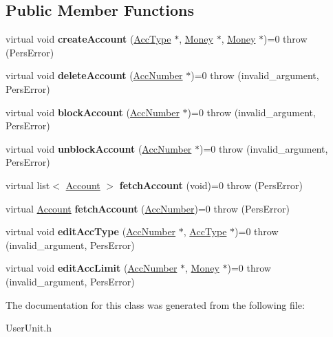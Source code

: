 \subsection*{Public Member Functions}
\begin{DoxyCompactItemize}
\item 
\hypertarget{classUserAccAdm_a23b313ce179890606746ab3a279bd833}{virtual void {\bfseries create\-Account} (\hyperlink{classUsrType}{Acc\-Type} $\ast$, \hyperlink{classMoney}{Money} $\ast$, \hyperlink{classMoney}{Money} $\ast$)=0  throw (\-Pers\-Error)}\label{dd/d35/classUserAccAdm_a23b313ce179890606746ab3a279bd833}

\item 
\hypertarget{classUserAccAdm_a8257788e5e7d125b7482e490a6d71550}{virtual void {\bfseries delete\-Account} (\hyperlink{classAccNumber}{Acc\-Number} $\ast$)=0  throw (invalid\-\_\-argument, Pers\-Error)}\label{dd/d35/classUserAccAdm_a8257788e5e7d125b7482e490a6d71550}

\item 
\hypertarget{classUserAccAdm_ad9cdd01395ad7dd1b2c0887fe12b71b8}{virtual void {\bfseries block\-Account} (\hyperlink{classAccNumber}{Acc\-Number} $\ast$)=0  throw (invalid\-\_\-argument, Pers\-Error)}\label{dd/d35/classUserAccAdm_ad9cdd01395ad7dd1b2c0887fe12b71b8}

\item 
\hypertarget{classUserAccAdm_ae179b3e21f336b325452eb3c0981b0d9}{virtual void {\bfseries unblock\-Account} (\hyperlink{classAccNumber}{Acc\-Number} $\ast$)=0  throw (invalid\-\_\-argument, Pers\-Error)}\label{dd/d35/classUserAccAdm_ae179b3e21f336b325452eb3c0981b0d9}

\item 
\hypertarget{classUserAccAdm_aa84b9df92ad9e11b1d9c71e9350efdc7}{virtual list$<$ \hyperlink{classAccount}{Account} $>$ {\bfseries fetch\-Account} (void)=0  throw (\-Pers\-Error)}\label{dd/d35/classUserAccAdm_aa84b9df92ad9e11b1d9c71e9350efdc7}

\item 
\hypertarget{classUserAccAdm_a5957dcbf58d30b171a6ca0967dacf2d9}{virtual \hyperlink{classAccount}{Account} {\bfseries fetch\-Account} (\hyperlink{classAccNumber}{Acc\-Number})=0  throw (\-Pers\-Error)}\label{dd/d35/classUserAccAdm_a5957dcbf58d30b171a6ca0967dacf2d9}

\item 
\hypertarget{classUserAccAdm_a80d61347b448e3ae9bdca4e02e65bcd1}{virtual void {\bfseries edit\-Acc\-Type} (\hyperlink{classAccNumber}{Acc\-Number} $\ast$, \hyperlink{classUsrType}{Acc\-Type} $\ast$)=0  throw (invalid\-\_\-argument, Pers\-Error)}\label{dd/d35/classUserAccAdm_a80d61347b448e3ae9bdca4e02e65bcd1}

\item 
\hypertarget{classUserAccAdm_a43f0bb580d63a9c782e8c83417562a17}{virtual void {\bfseries edit\-Acc\-Limit} (\hyperlink{classAccNumber}{Acc\-Number} $\ast$, \hyperlink{classMoney}{Money} $\ast$)=0  throw (invalid\-\_\-argument, Pers\-Error)}\label{dd/d35/classUserAccAdm_a43f0bb580d63a9c782e8c83417562a17}

\end{DoxyCompactItemize}


The documentation for this class was generated from the following file\-:\begin{DoxyCompactItemize}
\item 
User\-Unit.\-h\end{DoxyCompactItemize}
